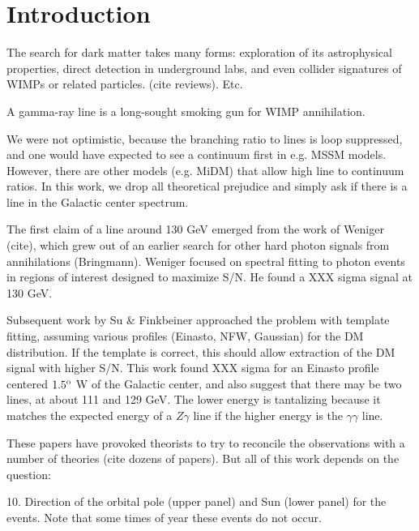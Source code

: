 \documentclass[aps,twocolumn,prd,superscriptaddress,showpacs,nofootinbib,fixfloat]{revtex4}
\newcommand{\degree}{^{\rm o}}
\begin{document}
\section{Introduction}
The search for dark matter takes many forms:  exploration of its astrophysical
properties, direct detection in underground labs, and even collider signatures
of WIMPs or related particles.  (cite reviews).   Etc. 

A gamma-ray line is a long-sought smoking gun for WIMP annihilation. 

We were not optimistic, because the branching ratio to lines is loop
suppressed, and one would have expected to see a continuum first in e.g. MSSM
models.  However, there are other models (e.g. MiDM) that allow high line to
continuum ratios.  In this work, we drop all theoretical prejudice and simply
ask if there is a line in the Galactic center spectrum. 

The first claim of a line around 130 GeV emerged from the work of Weniger
(cite), which grew out of an earlier search for other hard photon signals from
annihilations (Bringmann).  Weniger focused on spectral fitting to photon
events in regions of interest designed to maximize S/N.  He found a XXX sigma
signal at 130 GeV. 

Subsequent work by Su \& Finkbeiner approached the problem with template
fitting, assuming various profiles (Einasto, NFW, Gaussian) for the DM
distribution.  If the template is correct, this should allow extraction of the
DM signal with higher S/N.   This work found XXX sigma for an Einasto profile
centered $1.5\degree$ W of the Galactic center, and also suggest that there
may be two lines, at about 111 and 129 GeV.  The lower energy is tantalizing
because it matches the expected energy of a $Z\gamma$ line if the higher
energy is the $\gamma\gamma$ line. 

These papers have provoked theorists to try to reconcile the observations with
a number of theories (cite dozens of papers).  But all of this work depends on
the question:












10.  Direction of the orbital pole (upper panel) and Sun (lower panel)
for the events.   Note that some times of year these events do not
occur.
\end{document}
